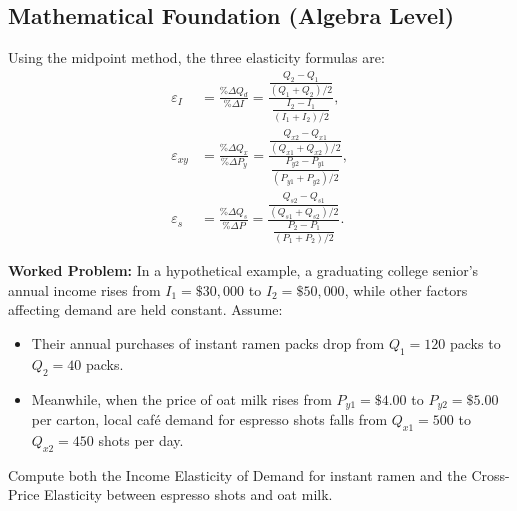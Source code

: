 \documentclass[11pt,letterpaper]{article}
\begin{document}
\subsection*{Mathematical Foundation (Algebra Level)}
Using the midpoint method, the three elasticity formulas are:
\begin{align}
\varepsilon_I &= \frac{\%\Delta Q_d}{\%\Delta I}
= \frac{\dfrac{Q_2 - Q_1}{(Q_1 + Q_2)/2}}{\dfrac{I_2 - I_1}{(I_1 + I_2)/2}},\\
\varepsilon_{xy} &= \frac{\%\Delta Q_x}{\%\Delta P_y}
= \frac{\dfrac{Q_{x2} - Q_{x1}}{(Q_{x1} + Q_{x2})/2}}{\dfrac{P_{y2} - P_{y1}}{(P_{y1} + P_{y2})/2}},\\
\varepsilon_s &= \frac{\%\Delta Q_s}{\%\Delta P}
= \frac{\dfrac{Q_{s2} - Q_{s1}}{(Q_{s1} + Q_{s2})/2}}{\dfrac{P_2 - P_1}{(P_1 + P_2)/2}}.
\end{align}

\noindent\textbf{Worked Problem:}
In a hypothetical example, a graduating college senior's annual income rises from $I_1 = \$30{,}000$ to $I_2 = \$50{,}000$, while other factors affecting demand are held constant. Assume:
\begin{itemize}
    \item Their annual purchases of instant ramen packs drop from $Q_1 = 120$ packs to $Q_2 = 40$ packs.
    \item Meanwhile, when the price of oat milk rises from $P_{y1} = \$4.00$ to $P_{y2} = \$5.00$ per carton, local café demand for espresso shots falls from $Q_{x1} = 500$ to $Q_{x2} = 450$ shots per day.
\end{itemize}
Compute both the Income Elasticity of Demand for instant ramen and the Cross-Price Elasticity between espresso shots and oat milk.
\end{document}
